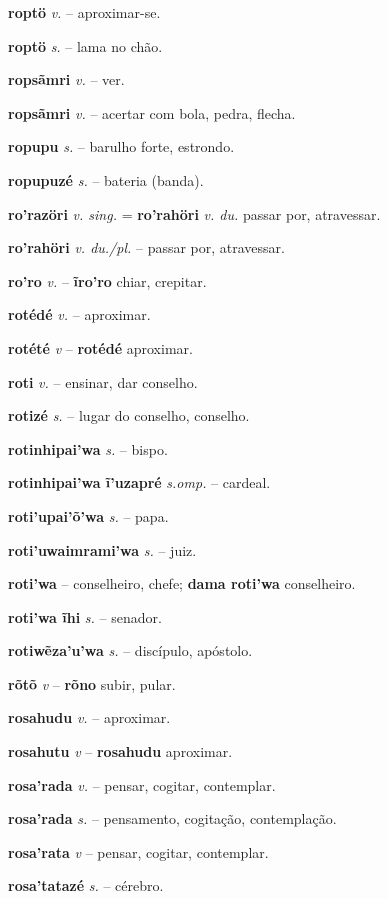 \textbf{roptö} \textit{v.} -- aproximar-se.

\textbf{roptö} \textit{s.} -- lama no chão.

\textbf{ropsãmri} \textit{v.} -- ver.

\textbf{ropsãmri} \textit{v.} -- acertar com bola, pedra, flecha.

\textbf{ropupu} \textit{s.} -- barulho forte, estrondo.

\textbf{ropupuzé} \textit{s.} -- bateria (banda).

\textbf{ro'razöri} \textit{v. sing.} = \textbf{ro'rahöri} \textit{v. du.} passar por, atravessar.

\textbf{ro'rahöri} \textit{v. du./pl.} -- passar por, atravessar.

\textbf{ro'ro} \textit{v.} -- \textbf{ĩro'ro} chiar, crepitar.

\textbf{rotédé} \textit{v.} -- aproximar.

\textbf{rotété} \textit{v} -- \textbf{rotédé} aproximar.

\textbf{roti} \textit{v.} -- ensinar, dar conselho.

\textbf{rotizé} \textit{s.} -- lugar do conselho, conselho.

\textbf{rotinhipai'wa} \textit{s.} -- bispo.

\textbf{rotinhipai'wa ĩ'uzapré} \textit{s.omp.} -- cardeal.

\textbf{roti'upai'õ'wa} \textit{s.} -- papa.

\textbf{roti'uwaimrami'wa} \textit{s.} -- juiz.

\textbf{roti'wa} -- conselheiro, chefe; \textbf{dama roti'wa} conselheiro.

\textbf{roti'wa ĩhi} \textit{s.} -- senador.

\textbf{rotiwẽza'u'wa} \textit{s.} -- discípulo, apóstolo.

\textbf{rõtõ} \textit{v} -- \textbf{rõno} subir, pular.

\textbf{rosahudu} \textit{v.} -- aproximar.

\textbf{rosahutu} \textit{v} -- \textbf{rosahudu} aproximar.

\textbf{rosa'rada} \textit{v.} -- pensar, cogitar, contemplar.

\textbf{rosa'rada} \textit{s.} -- pensamento, cogitação, contemplação.

\textbf{rosa'rata} \textit{v} -- pensar, cogitar, contemplar.

\textbf{rosa'tatazé} \textit{s.} -- cérebro.

